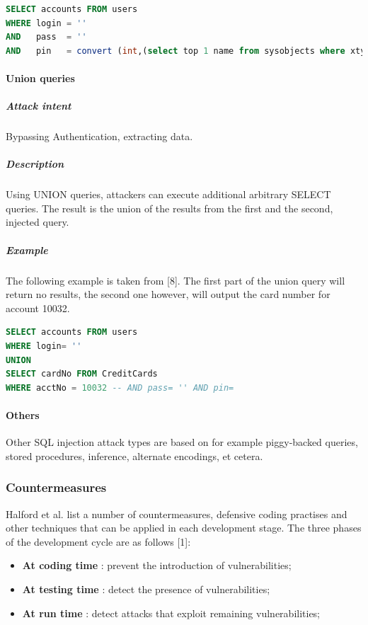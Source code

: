 \begin{lstlisting}[language=sql, caption=Illegal / logically incorrect query., label=listing:sql-injection:illegalquery]
SELECT accounts FROM users
WHERE login = ''
AND   pass  = ''
AND   pin   = convert (int,(select top 1 name from sysobjects where xtype='u'))
\end{lstlisting}


\paragraph{Union queries}

\subparagraph{Attack intent} Bypassing Authentication, extracting data.
\subparagraph{Description} Using UNION queries, attackers can execute additional arbitrary SELECT queries. The result is the union of the results from the first and the second, injected query.
\subparagraph{Example} The following example is taken from [8]. The first part of the union query will return no results, the second one however, will output the card number for account 10032.

\begin{lstlisting}[language=sql, caption=Union query., label=listing:sql-injection:unionquery]
SELECT accounts FROM users
WHERE login= ''
UNION
SELECT cardNo FROM CreditCards
WHERE acctNo = 10032 -- AND pass= '' AND pin=
\end{lstlisting}



\paragraph{Others}

Other SQL injection attack types are based on for example piggy-backed queries, stored procedures, inference, alternate encodings, et cetera.


\subsubsection{Countermeasures}

Halford et al. list a number of countermeasures, defensive coding practises and other techniques that can be applied in each development stage. The three phases of the development cycle are as follows [1]:
\begin{itemize}
	\item \textbf{At coding time} : prevent the introduction of vulnerabilities;
	\item \textbf{At testing time} : detect the presence of vulnerabilities;
	\item \textbf{At run time} : detect attacks that exploit remaining vulnerabilities;
\end{itemize}


